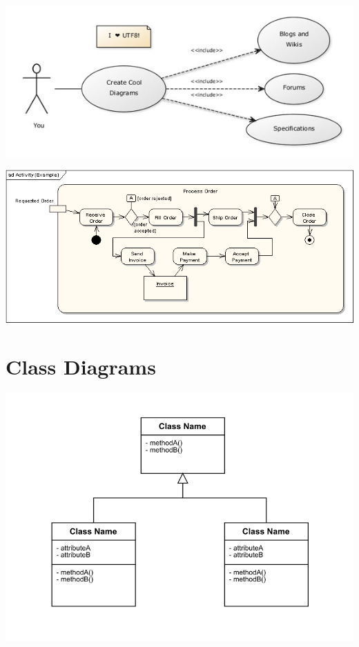 \documentclass{article}[18pt]
\begin{document}
\begin{itemize}
	\begin{center}
		\includegraphics[scale=0.7]{UML1}
	\end{center}
	\begin{center}
		\includegraphics[scale=0.7]{UML2}
	\end{center}
\section{Class Diagrams}
\begin{center}
	\includegraphics[scale=0.7]{"Class Diagrams2"}
\end{center}


\end{itemize}
\end{document}
